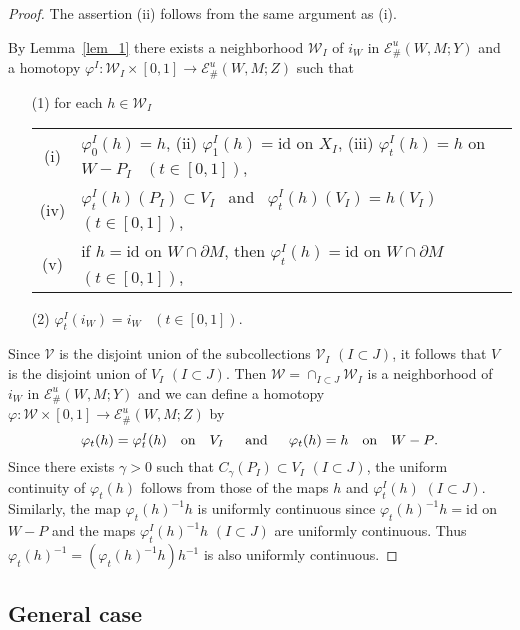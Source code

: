 \documentclass[11pt, fleqn]{amsart}
\theoremstyle{definition}
\newcommand{\cal}{\mathcal}
\renewcommand{\phi}{\varphi}
\newcommand{\lra}{\longrightarrow}
\newcommand{\id}{\mathrm{id}}
\newcommand{\E}{\mathcal E}
\newcommand{\W}{\mathcal W}
\begin{document}
\begin{proof}
The assertion (ii) follows from the same argument as (i). 

By Lemma~\ref{lem_1} there exists 
a neighborhood $\W_I$ of $i_W$ in $\E^u_\#(W, M; Y)$ and 
a homotopy $\phi^I : \W_I \times [0,1] \lra \E^u_\#(W, M; Z)$ such that 
\begin{itemize} 
\item[(1)] for each $h \in \W_I$ \\ 
\begin{tabular}[t]{c@{\ \,}l}
{\rm (i)} & $\phi^I_0(h) = h$, \hspace{3mm} 
{\rm (ii)} $\phi^I_1(h) = \id$ on $X_I$, \hspace{3mm} 
{\rm (iii)} $\phi^I_t(h) = h$ on $W - P_I$ \ $(t \in [0,1])$, \\[2mm] 
{\rm (iv)} & $\phi^I_t(h)(P_I) \subset V_I$ \  and \ $\phi^I_t(h)(V_I) = h(V_I)$ \ $(t \in [0,1])$, \\[2mm] 
{\rm (v)} & if $h = \id$ on $W \cap \partial M$, then $\phi^I_t(h) = \id$ on $W \cap \partial M$ $(t \in [0,1])$, 
\end{tabular}
\vskip 1.5mm 
\item[(2)] $\phi^I_t(i_W) = i_W$ \ $(t \in [0,1])$.
\end{itemize} 

Since ${\cal V}$ is the disjoint union of the subcollections ${\cal V}_I$ $(I \subset J)$, 
it follows that $V$ is the disjoint union of $V_I$ $(I \subset J)$.  
Then ${\cal W} = \cap_{I \subset J} {\cal W}_I$ is a neighborhood of $i_W$ in $\E^u_\#(W, M; Y)$ and we can define 
a homotopy $\phi : \W \times [0,1] \lra \E^u_\#(W, M; Z)$ by  
$$\mbox{$\phi_t(h) = \phi^I_t(h)$ \ \ on \ \ $V_I$ \hspace{3mm} and \hspace{3mm} $\phi_t(h) = h$ \ \ on \ \ $W - P$.}$$  
Since there exists $\gamma > 0$ such that $C_\gamma(P_I) \subset V_I$ $(I \subset J)$, 
the uniform continuity of $\phi_t(h)$ follows from those of the maps $h$ and $\phi^I_t(h)$ $(I \subset J)$. 
Similarly, the map $\phi_t(h)^{-1}h$ is uniformly continuous since $\phi_t(h)^{-1}h = \id$ on $W - P$ and 
the maps $\phi^I_t(h)^{-1}h$ $(I \subset J)$ are uniformly continuous. 
Thus $\phi_t(h)^{-1} = (\phi_t(h)^{-1}h)h^{-1}$ is also uniformly continuous. 
\end{proof} 

\subsection{General case} \mbox{} 
\end{document}
